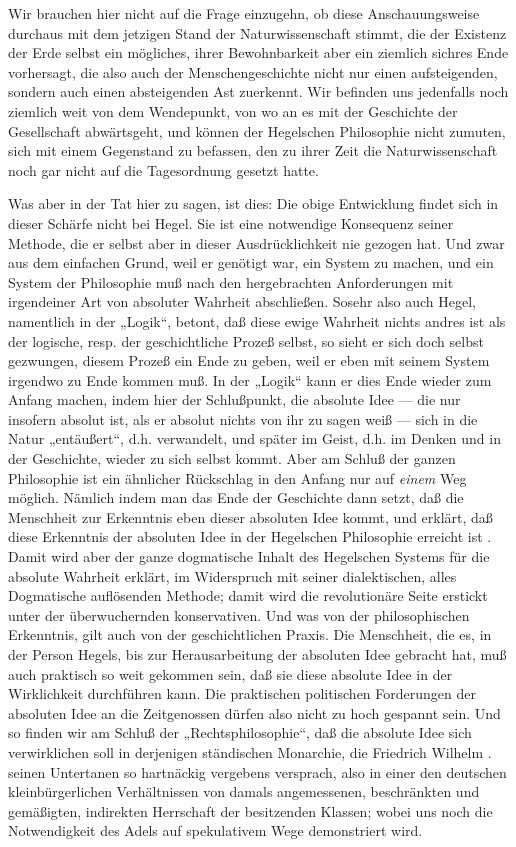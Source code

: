 Wir brauchen hier nicht auf die Frage einzugehn, ob diese
Anschauungsweise durchaus mit dem jetzigen Stand der Naturwissenschaft
stimmt, die der Existenz der Erde selbst ein mögliches, ihrer
Bewohnbarkeit aber ein ziemlich sichres Ende vorhersagt, die also auch
der Menschengeschichte nicht nur einen aufsteigenden, sondern auch einen
absteigenden Ast zuerkennt. Wir befinden uns jedenfalls noch ziemlich
weit von dem Wendepunkt, von wo an es mit der Geschichte der
Gesellschaft abwärtsgeht, und können der Hegelschen Philosophie nicht
zumuten, sich mit einem Gegenstand zu befassen, den zu ihrer Zeit die
Naturwissenschaft noch gar nicht auf die Tagesordnung gesetzt hatte.

Was aber in der Tat hier zu sagen, ist dies: Die obige
Entwicklung findet sich in dieser Schärfe nicht bei Hegel. Sie ist eine
notwendige Konsequenz seiner Methode, die er selbst aber in dieser
Ausdrücklichkeit nie gezogen hat. Und zwar aus dem einfachen Grund, weil
er genötigt war, ein System zu machen, und ein System der Philosophie
muß nach den hergebrachten Anforderungen mit irgendeiner Art von
absoluter Wahrheit abschließen. Sosehr also auch Hegel, namentlich in
der „Logik``, betont, daß diese ewige Wahrheit nichts andres ist als der
logische, resp. der geschichtliche Prozeß selbst, so sieht er sich doch
selbst gezwungen, diesem Prozeß ein Ende zu geben, weil er eben mit
seinem System irgendwo zu Ende kommen muß. In der „Logik`` kann er dies
Ende wieder zum Anfang machen, indem hier der Schlußpunkt, die absolute
Idee --- die nur insofern absolut ist, als er absolut nichts von ihr zu
sagen weiß --- sich in die Natur „entäußert``, d.h. verwandelt, und später
im Geist, d.h. im Denken und in der Geschichte, wieder zu sich selbst
kommt. Aber am Schluß der ganzen Philosophie ist ein ähnlicher
Rückschlag in den Anfang nur auf \emph{einem} Weg möglich. Nämlich indem
man das Ende der Geschichte dann setzt, daß die Menschheit zur
Erkenntnis eben dieser absoluten Idee kommt, \textbar{} und erklärt, daß diese
Erkenntnis der absoluten Idee in der Hegelschen Philosophie erreicht ist
\textbar{}. Damit wird aber der ganze dogmatische Inhalt des Hegelschen Systems
für die absolute Wahrheit erklärt, im Widerspruch mit seiner
dialektischen, alles Dogmatische auflösenden Methode; damit wird die
revolutionäre Seite erstickt unter der überwuchernden konservativen. Und
was von der philosophischen Erkenntnis, gilt auch von der
geschichtlichen Praxis. Die Menschheit, die es, in der Person Hegels,
bis zur Herausarbeitung der absoluten Idee gebracht hat, muß auch
praktisch so weit gekommen sein, daß sie diese absolute Idee in der
Wirklichkeit durchführen kann. Die praktischen politischen Forderungen
der absoluten Idee an die Zeitgenossen dürfen also nicht zu hoch
gespannt sein. Und so finden wir am Schluß der „Rechtsphilosophie``, daß
die absolute Idee sich verwirklichen soll in derjenigen ständischen
Monarchie, die Friedrich Wilhelm . seinen Untertanen so hartnäckig
vergebens versprach, also in einer den deutschen kleinbürgerlichen
Verhältnissen von damals angemessenen, beschränkten und gemäßigten,
indirekten Herrschaft der besitzenden Klassen; wobei uns noch die
Notwendigkeit des Adels auf spekulativem Wege demonstriert wird.

